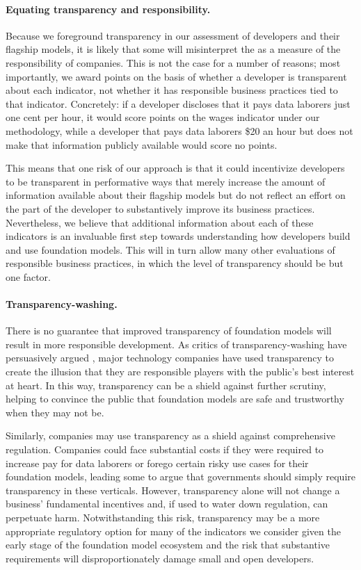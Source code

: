 \documentclass[screen, authorversion, acmsmall]{acmart}
\begin{document}
\paragraph{Equating transparency and responsibility.} 
Because we foreground transparency in our assessment of developers and their flagship models, it is likely that some will misinterpret the \projectname as a measure of the responsibility of companies. 
This is not the case for a number of reasons; most importantly, we award points on the basis of whether a developer is transparent about each indicator, not whether it has responsible business practices tied to that indicator.
Concretely: if a developer discloses that it pays data laborers just one cent per hour, it would score points on the wages indicator under our methodology, while a developer that pays data laborers \$20 an hour but does not make that information publicly available would score no points. 

This means that one risk of our approach is that it could incentivize developers to be transparent in performative ways that merely increase the amount of information available about their flagship models but do not reflect an effort on the part of the developer to substantively improve its business practices. 
Nevertheless, we believe that additional information about each of these indicators is an invaluable first step towards understanding how developers build and use foundation models. 
This will in turn allow many other evaluations of responsible business practices, in which the level of transparency should be but one factor.

\paragraph{Transparency-washing.} 
There is no guarantee that improved transparency of foundation models will result in more responsible development.
As critics of transparency-washing have persuasively argued \citep{zalnieriute2021transparency}, major technology companies have used transparency to create the illusion that they are responsible players with the public's best interest at heart.
In this way, transparency can be a shield against further scrutiny, helping to convince the public that foundation models are safe and trustworthy when they may not be.

Similarly, companies may use transparency as a shield against comprehensive regulation. 
Companies could face substantial costs if they were required to increase pay for data laborers or forego certain risky use cases for their foundation models, leading some to argue that governments should simply require transparency in these verticals.
However, transparency alone will not change a business' fundamental incentives and, if used to water down regulation, can perpetuate harm.
Notwithstanding this risk, transparency may be a more appropriate regulatory option for many of the indicators we consider given the early stage of the foundation model ecosystem and the risk that substantive requirements will disproportionately damage small and open developers.
\end{document}
